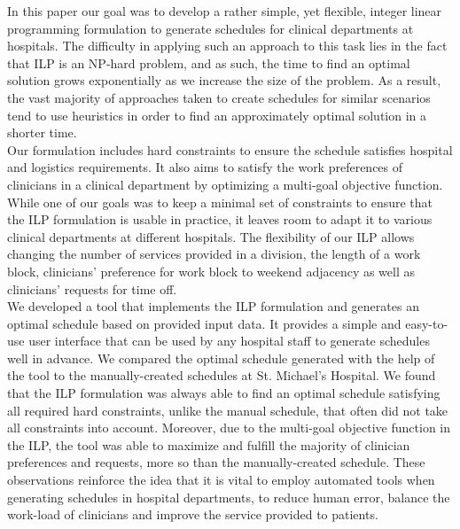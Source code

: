 In this paper our goal was to develop a rather simple, yet flexible, integer linear programming formulation to generate schedules for clinical departments at hospitals. The difficulty in applying such an approach to this task lies in the fact that ILP is an NP-hard problem, and as such, the time to find an optimal solution grows exponentially as we increase the size of the problem. As a result, the vast majority of approaches taken to create schedules for similar scenarios tend to use heuristics in order to find an approximately optimal solution in a shorter time. \\

Our formulation includes hard constraints to ensure the schedule satisfies hospital and logistics requirements. It also aims to satisfy the work preferences of clinicians in a clinical department by optimizing a multi-goal objective function. While one of our goals was to keep a minimal set of constraints to ensure that the ILP formulation is usable in practice, it leaves room to adapt it to various clinical departments at different hospitals. The flexibility of our ILP allows changing the number of services provided in a division, the length of a work block, clinicians' preference for work block to weekend adjacency as well as clinicians' requests for time off. \\

We developed a tool that implements the ILP formulation and generates an optimal schedule based on provided input data. It provides a simple and easy-to-use user interface that can be used by any hospital staff to generate schedules well in advance. We compared the optimal schedule generated with the help of the tool to the manually-created schedules at St. Michael's Hospital. We found that the ILP formulation was always able to find an optimal schedule satisfying all required hard constraints, unlike the manual schedule, that often did not take all constraints into account. Moreover, due to the multi-goal objective function in the ILP, the tool was able to maximize and fulfill the majority of clinician preferences and requests, more so than the manually-created schedule. These observations reinforce the idea that it is vital to employ automated tools when generating schedules in hospital departments, to reduce human error, balance the work-load of clinicians and improve the service provided to patients. \\

